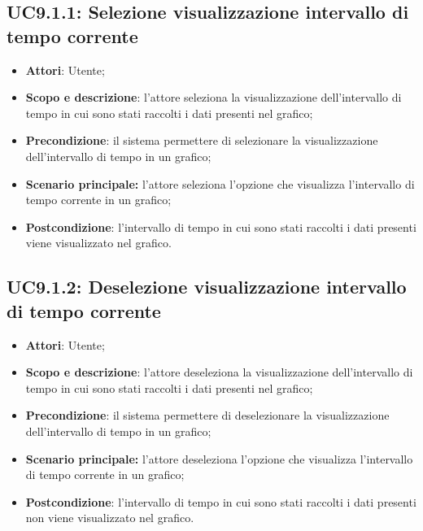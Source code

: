 \subsection{UC9.1.1: Selezione visualizzazione intervallo di tempo corrente}
\hypertarget{UC9.1.1}{}
\begin{itemize}
	\item \textbf{Attori}: Utente;
	\item \textbf{Scopo e descrizione}: l'attore seleziona la visualizzazione dell'intervallo di tempo in cui sono stati raccolti i dati presenti nel grafico;
	\item \textbf{Precondizione}: il sistema permettere di selezionare la visualizzazione dell'intervallo di tempo in un grafico;
	\item \textbf{Scenario principale:} l'attore seleziona l'opzione che visualizza l'intervallo di tempo corrente in un grafico;
	\item \textbf{Postcondizione}: l'intervallo di tempo in cui sono stati raccolti i dati presenti viene visualizzato nel grafico.
\end{itemize}

\subsection{UC9.1.2: Deselezione visualizzazione intervallo di tempo corrente}
\hypertarget{UC9.1.2}{}
\begin{itemize}
	\item \textbf{Attori}: Utente;
	\item \textbf{Scopo e descrizione}: l'attore deseleziona la visualizzazione dell'intervallo di tempo in cui sono stati raccolti i dati presenti nel grafico;
	\item \textbf{Precondizione}: il sistema permettere di deselezionare la visualizzazione dell'intervallo di tempo in un grafico;
	\item \textbf{Scenario principale:} l'attore deseleziona l'opzione che visualizza l'intervallo di tempo corrente in un grafico;
	\item \textbf{Postcondizione}: l'intervallo di tempo in cui sono stati raccolti i dati presenti non viene visualizzato nel grafico.
\end{itemize}

